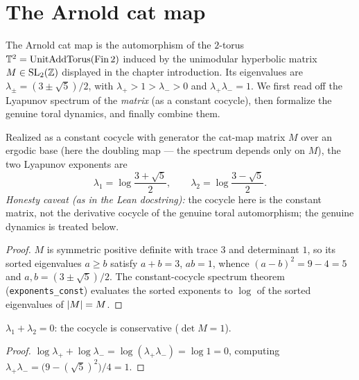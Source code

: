 \section{The Arnold cat map}

The Arnold cat map is the automorphism of the \(2\)-torus
\(\mathbb{T}^2 = \operatorname{UnitAddTorus}(\operatorname{Fin} 2)\) induced by the unimodular hyperbolic matrix
\(M\in\mathrm{SL}_2(\mathbb{Z})\) displayed in the chapter introduction. Its eigenvalues are
\(\lambda_{\pm} = (3\pm\sqrt5)/2\), with \(\lambda_+ > 1 > \lambda_- > 0\) and
\(\lambda_+\lambda_- = 1\). We first read off the Lyapunov spectrum of the \emph{matrix} (as a
constant cocycle), then formalize the genuine toral dynamics, and finally combine them.

\begin{theorem}\label{catMapMatrix_exponents}
  \leanok
  Realized as a constant cocycle with generator the cat-map matrix \(M\)
  over an ergodic base (here the doubling map --- the spectrum depends only on \(M\)), the two
  Lyapunov exponents are
  \[
    \lambda_1 = \log\frac{3+\sqrt5}{2}, \qquad \lambda_2 = \log\frac{3-\sqrt5}{2}.
  \]
  \emph{Honesty caveat (as in the Lean docstring):} the cocycle here is the constant matrix, not
  the derivative cocycle of the genuine toral automorphism; the genuine dynamics is treated below.
\end{theorem}
\begin{proof}\leanok
  \(M\) is symmetric positive definite with trace \(3\) and determinant \(1\), so its sorted
  eigenvalues \(a\ge b\) satisfy \(a + b = 3\), \(ab = 1\), whence
  \((a-b)^2 = 9 - 4 = 5\) and \(a,b = (3\pm\sqrt5)/2\). The constant-cocycle spectrum theorem
  (\texttt{exponents\_const}) evaluates the sorted exponents to \(\log\) of the sorted
  eigenvalues of \(\left\lvert M \right\rvert = M\).
\end{proof}

\begin{corollary}\label{catMapMatrix_exponents_sum_eq_zero}
  \leanok
  \(\lambda_1 + \lambda_2 = 0\): the cocycle is conservative (\(\det M = 1\)).
\end{corollary}
\begin{proof}\leanok
  \(\log\lambda_+ + \log\lambda_- = \log(\lambda_+\lambda_-) = \log 1 = 0\), computing
  \(\lambda_+\lambda_- = \bigl(9 - (\sqrt5)^2\bigr)/4 = 1\).
\end{proof}

